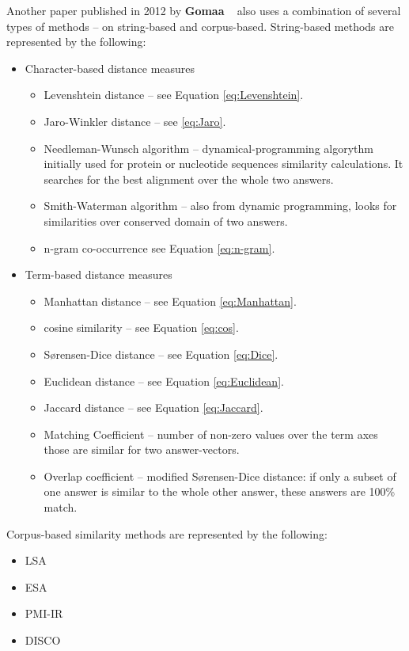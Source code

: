 Another paper published in 2012 by \textbf{Gomaa} ~\cite{Gomaa} also uses a combination of several types of methods -- on string-based and corpus-based. String-based methods are represented by the following:
\begin{itemize}
\item Character-based distance measures
\begin{itemize}
\item Levenshtein distance -- see Equation \ref{eq:Levenshtein}.
\item Jaro-Winkler distance -- see \ref{eq:Jaro}.
\item Needleman-Wunsch algorithm -- dynamical-programming algorythm initially used for protein or nucleotide sequences similarity calculations. It searches for the best alignment over the whole two answers.
\item Smith-Waterman algorithm -- also from dynamic programming, looks for similarities over conserved domain of two answers. 
\item n-gram co-occurrence see Equation \ref{eq:n-gram}.
\end{itemize}
\item Term-based distance measures
\begin{itemize}
\item Manhattan distance -- see Equation \ref{eq:Manhattan}.
\item cosine similarity -- see Equation \ref{eq:cos}.
\item S{\o}rensen-Dice distance -- see Equation \ref{eq:Dice}.
\item Euclidean distance -- see Equation \ref{eq:Euclidean}.
\item Jaccard distance -- see Equation \ref{eq:Jaccard}.
\item Matching Coefficient -- number of non-zero values over the term axes those are similar for two answer-vectors.
\item Overlap coefficient -- modified S{\o}rensen-Dice distance: if only a subset of one answer is similar to the whole other answer, these answers are 100\% match.
\end{itemize}
\end{itemize}

Corpus-based similarity methods are represented by the following:

\begin{itemize}
\item LSA
\item ESA
\item PMI-IR
\item DISCO
\end{itemize}

